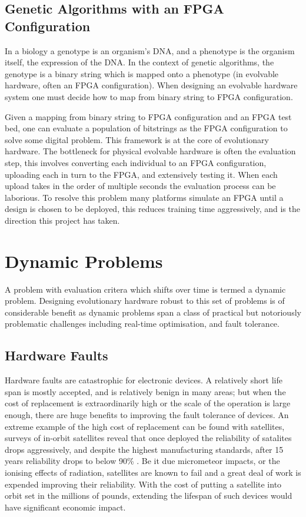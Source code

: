 \subsection{Genetic Algorithms with an FPGA Configuration}
In a biology a genotype is an organism's DNA, and a phenotype is
the organism itself, the expression of the DNA. In the context of genetic algorithms,
the genotype is a binary string which is mapped onto a phenotype (in evolvable
hardware, often an FPGA configuration). When designing an evolvable hardware
system one must decide how to map from binary string to FPGA configuration.

Given a mapping from binary string to FPGA configuration and an FPGA test bed, one can
evaluate a population of bitstrings as the FPGA configuration to solve some digital
problem. This framework is at the core of evolutionary hardware. The bottleneck for physical evolvable
hardware is often the evaluation step, this involves converting each individual
to an FPGA configuration, uploading each in turn
to the FPGA, and extensively testing it. When each upload takes in the order of
multiple seconds the evaluation process can be laborious. To resolve this problem
many platforms simulate an FPGA until a design is chosen to be deployed, this reduces
training time aggressively, and is the direction this project has taken.

\section{Dynamic Problems}

A problem with evaluation critera which shifts over time is termed a dynamic problem.
Designing
evolutionary hardware robust to this set of problems is of considerable benefit as
dynamic problems span a class of practical but notoriously problematic challenges including
real-time optimisation, and fault tolerance.

\subsection{Hardware Faults}
Hardware faults are catastrophic for electronic devices. A relatively short life span is
mostly accepted, and is relatively benign in many areas; but when the cost of replacement is
extraordinarily high or the scale of the operation is large enough, there are huge benefits
to improving the fault tolerance of devices. An extreme example of the high cost of replacement
can be found with satellites, surveys of in-orbit satellites reveal that once deployed the
reliability of satalites drops aggressively, and despite the highest manufacturing standards,
after 15 years reliability drops to below
90\% \cite{CASTET20091718}. Be it due micrometeor impacts,
or the ionising effects of radiation, satellites are known to fail and a great deal of
work is expended improving their reliability. With the cost
of putting a satellite into orbit set in the millions of pounds, extending the lifespan
of such devices would have significant economic impact.

